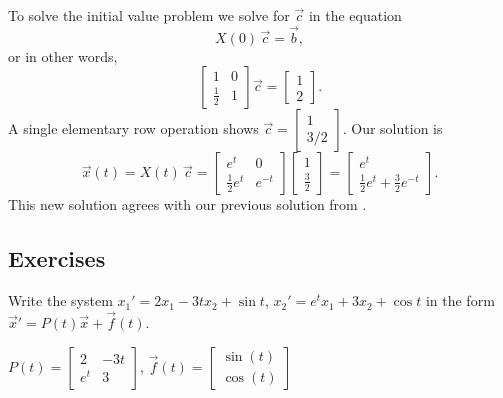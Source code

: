\begin{example}
To solve the initial value problem we solve for $\vec{c}$ in the equation
\begin{equation*}
X(0)\,\vec{c} = \vec{b} ,
\end{equation*}
or in other words,
\begin{equation*}
\begin{bmatrix}
1 & 0 \\
\frac{1}{2} & 1
\end{bmatrix} 
\vec{c} = 
\begin{bmatrix}
1 \\ 2
\end{bmatrix} .
\end{equation*}
A single elementary row operation shows
$\vec{c} =
\left[ \begin{smallmatrix} 1 \\ 3/2 \end{smallmatrix} \right]$.
Our solution is
\begin{equation*}
\vec{x}(t) = 
X(t)\,\vec{c} = 
\begin{bmatrix}
e^t & 0 \\
\frac{1}{2} e^t & e^{-t}
\end{bmatrix}
\begin{bmatrix}
1 \\ \frac{3}{2}
\end{bmatrix} =
\begin{bmatrix}
e^t \\
\frac{1}{2} e^t + \frac{3}{2} e^{-t}
\end{bmatrix} .
\end{equation*}
This new solution agrees with our previous solution from .
\end{example}

\subsection{Exercises}

\begin{exercise}
Write the system $x_1' = 2 x_1 - 3t x_2 + \sin t$,
$x_2' = e^t x_1 + 3 x_2 + \cos t$ in the form
${\vec{x}}' = P(t) \vec{x} + \vec{f}(t)$.
\end{exercise}
\comboSol{%
}
{%
$P(t) = \left[\begin{smallmatrix} 2 & -3t \\ e^t & 3 \end{smallmatrix}\right]$, $\vec{f}(t) = \left[\begin{smallmatrix}  \sin(t)\\ \cos(t) \end{smallmatrix}\right]$
}

